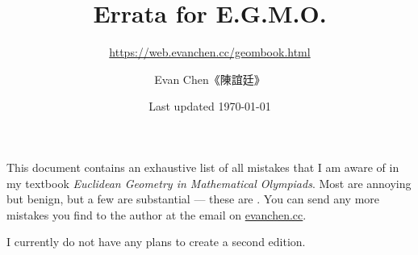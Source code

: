 \documentclass[11pt]{scrartcl}
\begin{document}
\title{Errata for E.G.M.O.}
\subtitle{\url{https://web.evanchen.cc/geombook.html}}
\author{Evan Chen《陳誼廷》}
\date{Last updated \today}
\maketitle

This document contains an exhaustive list of all mistakes
that I am aware of in my textbook \emph{Euclidean Geometry in Mathematical Olympiads}.
Most are annoying but benign, but a few are substantial --- these are
.
You can send any more mistakes you find to the author at
the email on \url{evanchen.cc}.

I currently do not have any plans to create a second edition.
\end{document}
